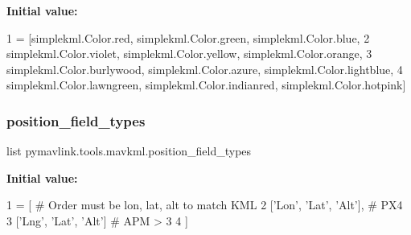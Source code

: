 {\bfseries Initial value\+:}
\begin{DoxyCode}
1 =  [simplekml.Color.red, simplekml.Color.green, simplekml.Color.blue,
2           simplekml.Color.violet, simplekml.Color.yellow, simplekml.Color.orange,
3           simplekml.Color.burlywood, simplekml.Color.azure, simplekml.Color.lightblue,
4           simplekml.Color.lawngreen, simplekml.Color.indianred, simplekml.Color.hotpink]
\end{DoxyCode}
\mbox{\label{namespacepymavlink_1_1tools_1_1mavkml_a1b6364cf6f6e383862ef5bb27ca7fedf}} 
\subsubsection{\texorpdfstring{position\+\_\+field\+\_\+types}{position\_field\_types}}
{\footnotesize\ttfamily list pymavlink.\+tools.\+mavkml.\+position\+\_\+field\+\_\+types}

{\bfseries Initial value\+:}
\begin{DoxyCode}
1 =  [  \textcolor{comment}{# Order must be lon, lat, alt to match KML}
2   [\textcolor{stringliteral}{'Lon'}, \textcolor{stringliteral}{'Lat'}, \textcolor{stringliteral}{'Alt'}],  \textcolor{comment}{# PX4}
3   [\textcolor{stringliteral}{'Lng'}, \textcolor{stringliteral}{'Lat'}, \textcolor{stringliteral}{'Alt'}]   \textcolor{comment}{# APM > 3}
4 ]
\end{DoxyCode}

